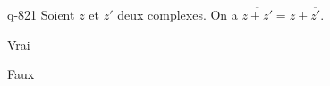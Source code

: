 \begin{truefalse}{q-821}
Soient $z$ et $z'$ deux complexes. On a $\overline{z+z'} = \overline z + \overline {z'}$.
\item* Vrai
\item Faux
\end{truefalse}

